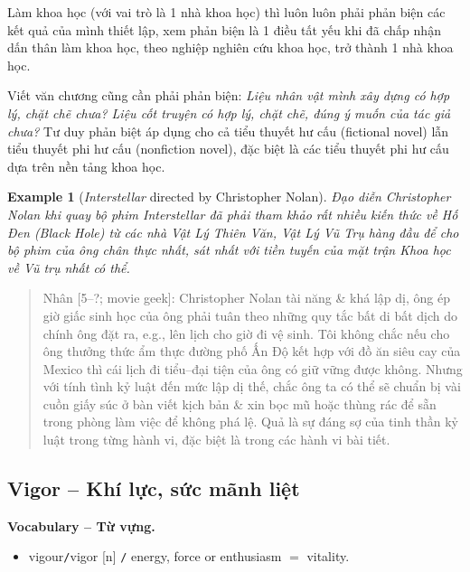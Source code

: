 \documentclass[12pt,twoside]{book}
\newtheorem{example}{Example}
\begin{document}
Làm khoa học (với vai trò là 1 nhà khoa học) thì luôn luôn phải phản biện các kết quả của mình thiết lập, xem phản biện là 1 điều tất yếu khi đã chấp nhận dấn thân làm khoa học, theo nghiệp nghiên cứu khoa học, trở thành 1 nhà khoa học.

Viết văn chương cũng cần phải phản biện: {\it Liệu nhân vật mình xây dựng có hợp lý, chặt chẽ chưa? Liệu cốt truyện có hợp lý, chặt chẽ, đúng ý muốn của tác giả chưa?} Tư duy phản biệt áp dụng cho cả tiểu thuyết hư cấu (fictional novel) lẫn tiểu thuyết phi hư cấu (nonfiction novel), đặc biệt là các tiểu thuyết phi hư cấu dựa trên nền tảng khoa học.

\begin{example}[{\it Interstellar} directed by {\sc Christopher Nolan}]
	Đạo diễn {\sc Christopher Nolan} khi quay bộ phim Interstellar đã phải tham khảo rất nhiều kiến thức về Hố Đen (Black Hole) từ các nhà Vật Lý Thiên Văn, Vật Lý Vũ Trụ hàng đầu để cho bộ phim của ông chân thực nhất, sát nhất với tiền tuyến của mặt trận Khoa học về Vũ trụ nhất có thể.
\end{example}

\begin{quote}
	{\sf Nhân [5--?; movie geek]}: {\sc Christopher Nolan} tài năng \& khá lập dị, ông ép giờ giấc sinh học của ông phải tuân theo những quy tắc bất di bất dịch do chính ông đặt ra, e.g., lên lịch cho giờ đi vệ sinh. Tôi không chắc nếu cho ông thưởng thức ẩm thực đường phố Ấn Độ kết hợp với đồ ăn siêu cay của Mexico thì cái lịch đi tiểu--đại tiện của ông có giữ vững được không. Nhưng với tính tình kỷ luật đến mức lập dị thế, chắc ông ta có thể sẽ chuẩn bị vài cuồn giấy súc ở bàn viết kịch bản \& xin bọc mũ hoặc thùng rác để sẵn trong phòng làm việc để không phá lệ. Quả là sự đáng sợ của tinh thần kỷ luật trong từng hành vi, đặc biệt là trong các hành vi bài tiết.
\end{quote}

\subsection{Vigor -- Khí lực, sức mãnh liệt}
\textbf{\textsf{\small Vocabulary -- Từ vựng.}}
\begin{itemize}\small
	\item {\sf vigour{\tt/}vigor} [n] {\tt/} energy, force or enthusiasm $=$ {\sf vitality}.
\end{itemize}
\end{document}
